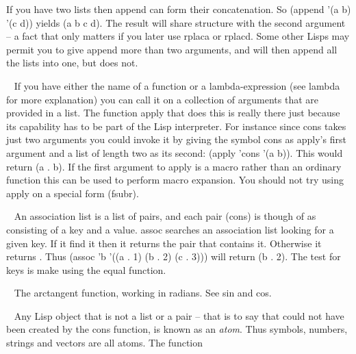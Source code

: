 \begin{description}
If you have two lists then {\tx append} can form their concatenation.
So {\tx (append '(a b) '(c d))} yields {\tx (a b c d)}. The
result will share structure with the second argument -- a fact that only
matters if you later use {\tx rplaca} or {\tx rplacd}. Some
other Lisps may permit you to give {\tx append} more than two arguments,
and will then append all the lists into one, but \vsl{} does not.
\item[{\tx apply~~~~~~~~} \hspace{1cm} {\em function 2 args}]~\newline
If you have either the name of a function or a lambda-expression (see
{\tx lambda} for more explanation) you can call it on a collection of
arguments that are provided in a list. The function {\tx apply} that
does this is really there just because its capability has to be part of the
Lisp interpreter. For instance since {\tx cons} takes just two
arguments you could invoke it by giving the symbol {\tx cons} as
{\tx apply}'s first argument and a list of length two as its second:
{\tx (apply 'cons '(a b))}. This would return {\tx (a . b)}.
If the first argument to {\tx apply} is a macro rather than an ordinary
function this can be used to perform macro expansion. You should not
try using {\tx apply} on a special form ({\tx fsubr}).
\item[{\tx assoc~~~~~~~~} \hspace{1cm} {\em function 2 args}]~\newline
An association list is a list of pairs, and each pair ({\tx cons}) is
though of as consisting of a key and a value. {\tx assoc} searches
an association list looking for a given key. If it find it then it returns
the pair that contains it. Otherwise it returns \nil. Thus
{\tx (assoc 'b '((a . 1) (b . 2) (c . 3)))} will return
{\tx (b . 2)}. The test for keys is make using the {\tx equal}
function.
\item[{\tx atan~~~~~~~~~} \hspace{1cm} {\em special form}]~\newline
The arctangent function, working in radians. See {\tx sin} and {\tx cos}.
\item[{\tx atom~~~~~~~~~} \hspace{1cm} {\em function 1 arg}]~\newline
Any Lisp object that is not a list or a pair -- that is to say that could
not have been created by the {\tx cons} function, is known as an {\em atom}.
Thus symbols, numbers, strings and vectors are all atoms. The function

\end{description}
